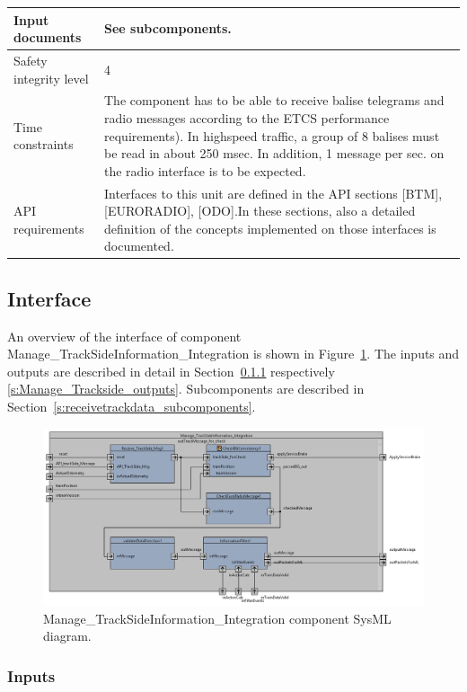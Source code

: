 \begin{longtable}{p{}p{}}
 \\
\midrule
Input documents			& See subcomponents.\\
\midrule
Safety integrity level	& 4 \\
\midrule
Time constraints		& The component has to be able to receive balise telegrams and radio messages according to the ETCS \cite{subset-41} performance requirements). In highspeed traffic, a group of 8 balises must be read in about 250 msec. In addition, 1 message per sec. on the radio interface is to be expected.\\
\midrule
API requirements 		& Interfaces to this unit are defined in the API sections [BTM], [EURORADIO], [ODO].In these sections, also a detailed definition of the concepts implemented on those interfaces is documented.  \\
\bottomrule
\end{longtable}


\subsection{Interface}

An overview of the interface of component Manage\_TrackSideInformation\_Integration is shown in Figure~\ref{f:receiveAndCheckConsistencyArch}. The inputs and outputs are described in detail in Section~\ref{s:Manage_Trackside_inputs} respectively \ref{s:Manage_Trackside_outputs}. Subcomponents are described in Section~\ref{s:receivetrackdata_subcomponents}.

\begin{figure}
\center
\includegraphics[width=\textwidth]{./images/Figure_1_IBD_Manage_TrackSideInformation_Integration_1.png}
\caption{Manage\_TrackSideInformation\_Integration component SysML diagram.}\label{f:receiveAndCheckConsistencyArch}
\end{figure}


\subsubsection{Inputs}\label{s:Manage_Trackside_inputs}

